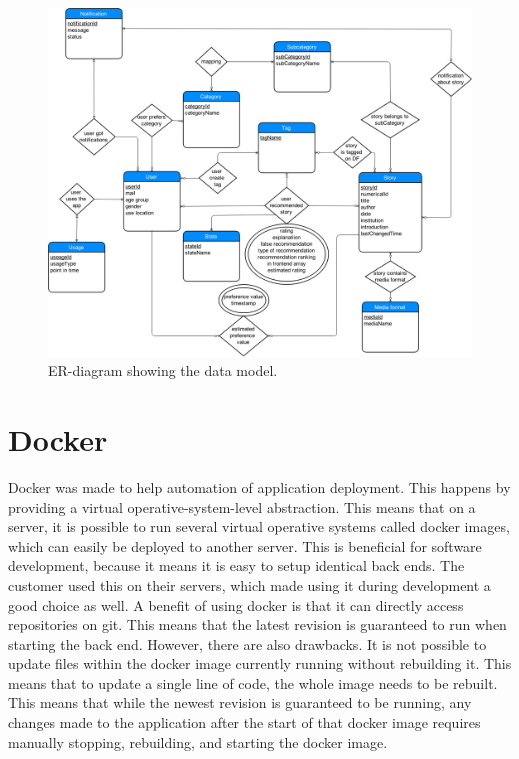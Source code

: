 \begin{figure}[h!]
	\centering
	\includegraphics[width=\textwidth]{fig/er_diagram}
	\caption{ER-diagram showing the data model.}
	\label{Fig:er_diagram}
\end{figure}


\section{Docker}
\label{subsec:docker}

Docker \cite{EHW2} was made to help automation of application deployment. This happens by providing a virtual operative-system-level abstraction. This means that on a server, it is possible to run several virtual operative systems called docker images, which can easily be deployed to another server. This is beneficial for software development, because it means it is easy to setup identical back ends. The customer used this on their servers, which made using it during development a good choice as well. A benefit of using docker is that it can directly access repositories on git. This means that the latest revision is guaranteed to run when starting the back end. However, there are also drawbacks. It is not possible to update files within the docker image currently running without rebuilding it. This means that to update a single line of code, the whole image needs to be rebuilt. This means that while the newest revision is guaranteed to be running, any changes made to the application after the start of that docker image requires manually stopping, rebuilding, and starting the docker image.


\cleardoublepage
